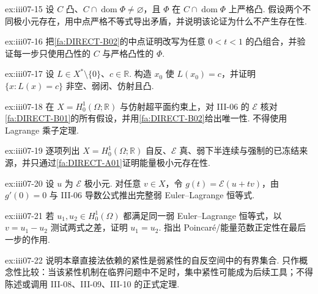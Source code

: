 \begin{FAExercise}[严格凸唯一性]{ex:iii07-15}
设 \(\displaystyle C\) 凸、\(\displaystyle C\cap\operatorname{dom}\Phi\neq\varnothing\)，且 \(\displaystyle\Phi\) 在 \(\displaystyle C\cap\operatorname{dom}\Phi\) 上严格凸. 假设两个不同极小元存在，用中点严格不等式导出矛盾，并说明该论证为什么不产生存在性.
\end{FAExercise}

\begin{FAExercise}[严格凸性给出唯一性的任意参数版本]{ex:iii07-16}
把\autoref{fa:DIRECT-B02}的中点证明改写为任意 \(\displaystyle0<t<1\) 的凸组合，并验证每一步只使用凸性的 \(\displaystyle C\) 与严格凸性的 \(\displaystyle\Phi\).
\end{FAExercise}

\begin{FAExercise}[仿射约束弱闭性]{ex:iii07-17}
设 \(\displaystyle L\in X^*\setminus\{0\}\)、\(\displaystyle c\in\mathbb R\). 构造 \(\displaystyle x_0\) 使 \(\displaystyle L(x_0)=c\)，并证明 \(\displaystyle\{x:L(x)=c\}\) 非空、弱闭、仿射且凸.
\end{FAExercise}

\begin{FAExercise}{ex:iii07-18}
在 \(\displaystyle X=H_0^1(\Omega;\mathbb R)\) 与仿射超平面约束上，对 III-06 的 \(\displaystyle\mathcal E\) 核对\autoref{fa:DIRECT-B01}的所有假设，并用\autoref{fa:DIRECT-B02}给出唯一性. 不得使用 Lagrange 乘子定理.
\end{FAExercise}

\begin{FAExercise}[椭圆能量泛函的直接法存在性]{ex:iii07-19}
逐项列出 \(\displaystyle X=H_0^1(\Omega;\mathbb R)\) 自反、\(\displaystyle\mathcal E\) 真、弱下半连续与强制的已冻结来源，并只通过\autoref{fa:DIRECT-A01}证明能量极小元存在性.
\end{FAExercise}

\begin{FAExercise}{ex:iii07-20}
设 \(\displaystyle u\) 为 \(\displaystyle\mathcal E\) 极小元. 对任意 \(\displaystyle v\in X\)，令 \(\displaystyle g(t)=\mathcal E(u+tv)\)，由 \(\displaystyle g'(0)=0\) 与 III-06 导数公式推出完整弱 Euler--Lagrange 恒等式.
\end{FAExercise}

\begin{FAExercise}[能量唯一性]{ex:iii07-21}
若 \(\displaystyle u_1,u_2\in H_0^1(\Omega)\) 都满足同一弱 Euler--Lagrange 恒等式，以 \(\displaystyle v=u_1-u_2\) 测试两式之差，证明 \(\displaystyle u_1=u_2\). 指出 Poincaré/能量范数正定性在最后一步的作用.
\end{FAExercise}

\begin{FAExercise}[后续集中紧性边界]{ex:iii07-22}
说明本章直接法依赖的紧性是弱紧性的自反空间中的有界集合. 只作概念性比较：当该紧性机制在临界问题中不足时，集中紧性可能成为后续工具；不得陈述或调用 III-08、III-09、III-10 的正式定理.
\end{FAExercise}
